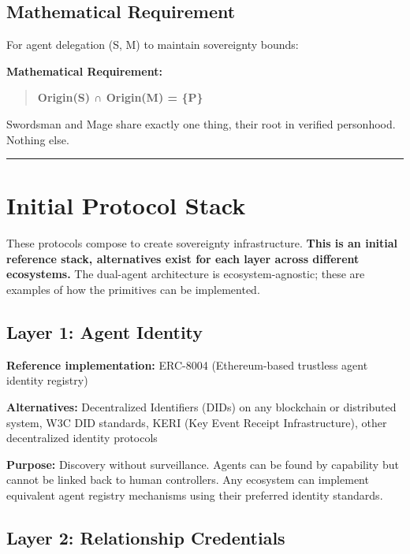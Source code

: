 \documentclass[
  11pt,
]{article}
\begin{document}
\subsection{Mathematical Requirement}\label{mathematical-requirement}

For agent delegation (S, M) to maintain sovereignty bounds:

\textbf{Mathematical Requirement:}

\begin{quote}
\textbf{Origin(S) ∩ Origin(M) = \{P\}}
\end{quote}

Swordsman and Mage share exactly one thing, their root in verified
personhood. Nothing else.

\begin{center}\rule{0.5\linewidth}{0.5pt}\end{center}

\section{Initial Protocol Stack}\label{initial-protocol-stack}

These protocols compose to create sovereignty infrastructure.
\textbf{This is an initial reference stack, alternatives exist for each
layer across different ecosystems.} The dual-agent architecture is
ecosystem-agnostic; these are examples of how the primitives can be
implemented.

\subsection{Layer 1: Agent Identity}\label{layer-1-agent-identity}

\textbf{Reference implementation:} ERC-8004 (Ethereum-based trustless
agent identity registry)

\textbf{Alternatives:} Decentralized Identifiers (DIDs) on any
blockchain or distributed system, W3C DID standards, KERI (Key Event
Receipt Infrastructure), other decentralized identity protocols

\textbf{Purpose:} Discovery without surveillance. Agents can be found by
capability but cannot be linked back to human controllers. Any ecosystem
can implement equivalent agent registry mechanisms using their preferred
identity standards.

\subsection{Layer 2: Relationship
Credentials}\label{layer-2-relationship-credentials}
\end{document}
